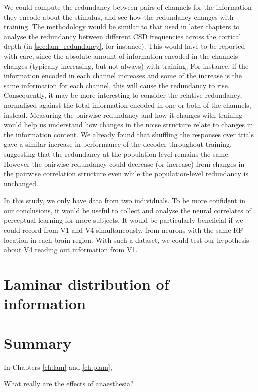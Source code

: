 We could compute the redundancy between pairs of channels for the information they encode about the stimulus, and see how the redundancy changes with training.
The methodology would be similar to that used in later chapters to analyse the redundancy between different \ac{CSD} frequencies across the cortical depth (in \autoref{sec:lam_redundancy}, for instance).
This would have to be reported with care, since the absolute amount of information encoded in the channels changes (typically increasing, but not always) with training.
For instance, if the information encoded in each channel increases and some of the increase is the same information for each channel, this will cause the redundancy to rise.
Consequently, it may be more interesting to consider the relative redundancy, normalised against the total information encoded in one or both of the channels, instead.
Measuring the pairwise redundancy and how it changes with training would help us understand how changes in the noise structure relate to changes in the information content.
We already found that shuffling the responses over trials gave a similar increase in performance of the decoder throughout training, suggesting that the redundancy at the population level remains the same.
However the pairwise redundancy could decrease (or increase) from changes in the pairwise correlation structure even while the population-level redundancy is unchanged.

In this study, we only have data from two individuals.
To be more confident in our conclusions, it would be useful to collect and analyse the neural correlates of perceptual learning for more subjects.
It would be particularly beneficial if we could record from \ac{V1} and \ac{V4} simultaneously, from neurons with the same \ac{RF} location in each brain region.
With such a dataset, we could test our hypothesis about \ac{V4} reading out information from \ac{V1}.


\section{Laminar distribution of information}

\section{Summary}

In Chapters \ref{ch:lam} and \ref{ch:plam},

What really are the effects of anaesthesia?


